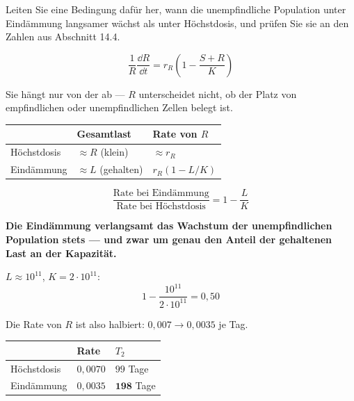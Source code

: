 \begin{aufgabe}
Leiten Sie eine Bedingung dafür her, wann die unempfindliche Population unter Eindämmung langsamer wächst als unter Höchstdosis, und prüfen Sie sie an den Zahlen aus Abschnitt 14.4.

\loesung
{}
\[ \frac{1}{R}\frac{\dd R}{\dd t} = r_R\left(1 - \frac{S+R}{K}\right) \]

Sie hängt nur von der  ab --- $R$ unterscheidet nicht, ob der Platz von empfindlichen oder unempfindlichen Zellen belegt ist.

\begin{center}
\renewcommand{\arraystretch}{1.5}
\begin{tabular}{@{}P{2.6cm}P{2.4cm}P{2.8cm}@{}}
\toprule
& \textbf{Gesamtlast} & \textbf{Rate von $R$}\\
\midrule
Höchstdosis & $\approx R$ (klein) & $\approx r_R$\\
Eindämmung & $\approx L$ (gehalten) & $r_R(1-L/K)$\\
\bottomrule
\end{tabular}
\end{center}

\[ \frac{\text{Rate bei Eindämmung}}{\text{Rate bei Höchstdosis}} = 1 - \frac{L}{K} \]

\begin{center}
\begin{minipage}{0.9\textwidth}
\textbf{Die Eindämmung verlangsamt das Wachstum der unempfindlichen Population stets --- und zwar um genau den Anteil der gehaltenen Last an der Kapazität.}
\end{minipage}
\end{center}

$L \approx 10^{11}$, $K = 2\cdot10^{11}$:
\[ 1 - \frac{10^{11}}{2\cdot10^{11}} = 0{,}50 \]

Die Rate von $R$ ist also halbiert: $0{,}007 \to 0{,}0035$ je Tag.

\begin{center}
\renewcommand{\arraystretch}{1.48}
\begin{tabular}{@{}P{2.6cm}P{2.2cm}P{2.6cm}@{}}
\toprule
& \textbf{Rate} & $T_2$\\
\midrule
Höchstdosis & $0{,}0070$ & $99$ Tage\\
Eindämmung & $0{,}0035$ & $\mathbf{198}$ Tage\\
\bottomrule
\end{tabular}
\end{center}


\end{aufgabe}
